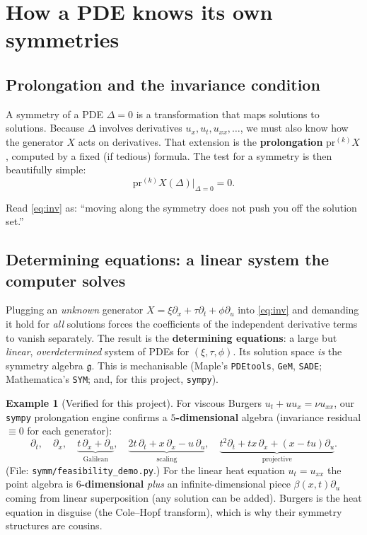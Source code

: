 \documentclass[11pt]{article}
\theoremstyle{definition}
\newtheorem{example}{Example}[section]
\theoremstyle{remark}
\newcommand{\g}{\mathfrak{g}}
\begin{document}
\section{How a PDE knows its own symmetries}

\subsection{Prolongation and the invariance condition}

A symmetry of a PDE $\Delta=0$ is a transformation that maps solutions to solutions. Because $\Delta$
involves derivatives $u_x,u_t,u_{xx},\dots$, we must also know how the generator $X$ acts on
derivatives. That extension is the \textbf{prolongation} $\mathrm{pr}^{(k)}X$, computed by a fixed
(if tedious) formula. The test for a symmetry is then beautifully simple:
\begin{equation}\label{eq:inv}
\boxed{\;\mathrm{pr}^{(k)}X(\Delta)\big|_{\Delta=0}=0.\;}
\end{equation}

Read \eqref{eq:inv} as: ``moving along the symmetry does not push you off the solution set.''

\subsection{Determining equations: a linear system the computer solves}

Plugging an \emph{unknown} generator $X=\xi\partial_x+\tau\partial_t+\phi\partial_u$ into \eqref{eq:inv}
and demanding it hold for \emph{all} solutions forces the coefficients of the independent derivative
terms to vanish separately. The result is the \textbf{determining equations}: a large but \emph{linear},
\emph{overdetermined} system of PDEs for $(\xi,\tau,\phi)$. Its solution space \emph{is} the symmetry
algebra $\g$. This is mechanisable (Maple's \texttt{PDEtools}, \texttt{GeM}, \texttt{SADE}; Mathematica's
\texttt{SYM}; and, for this project, \texttt{sympy}).

\begin{example}[Verified for this project]\label{ex:burgers}
For viscous Burgers $u_t+uu_x=\nu u_{xx}$, our \texttt{sympy} prolongation engine confirms a
\textbf{$5$-dimensional} algebra (invariance residual $\equiv 0$ for each generator):
\[
\partial_t,\quad \partial_x,\quad
\underbrace{t\,\partial_x+\partial_u}_{\text{Galilean}},\quad
\underbrace{2t\,\partial_t+x\,\partial_x-u\,\partial_u}_{\text{scaling}},\quad
\underbrace{t^2\partial_t+tx\,\partial_x+(x-tu)\partial_u}_{\text{projective}}.
\]
(File: \texttt{symm/feasibility\_demo.py}.) For the linear heat equation $u_t=u_{xx}$ the point algebra is
\textbf{$6$-dimensional} \emph{plus} an infinite-dimensional piece $\beta(x,t)\partial_u$ coming from
linear superposition (any solution can be added). Burgers is the heat equation in disguise (the
Cole--Hopf transform), which is why their symmetry structures are cousins.
\end{example}
\end{document}
